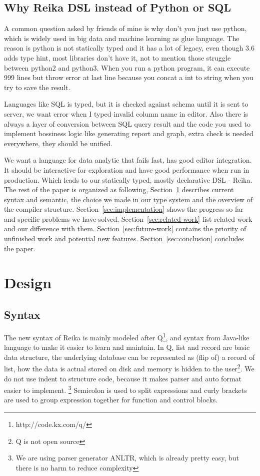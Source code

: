 \documentclass{article}
\begin{document}
\subsection{Why Reika DSL instead of Python or SQL}
\label{subsec:why-reika}

A common question asked by friends of mine is why don't you just use python,
which is widely used in big data and machine learning as glue language.
The reason is python is not statically typed and it has a lot of legacy,
even though 3.6 adds type hint, most libraries don't have it, not to mention those struggle between python2 and python3.
When you run a python program,
it can execute 999 lines but throw error at last line because you concat a int to string when you try to save the result.

Languages like SQL is typed, but it is checked against schema until it is sent to server,
we want error when I typed invalid column name in editor.
Also there is always a layer of conversion between SQL query result and the code you used to implement bossiness logic
like generating report and graph, extra check is needed everywhere, they should be unified.

We want a language for data analytic that fails fast, has good editor integration.
It should be interactive for exploration and have good performance when run in production.
Which leads to our statically typed, mostly declarative DSL - Reika.
The rest of the paper is organized as following,
Section~\ref{sec:design} describes current syntax and semantic,
the choice we made in our type system and the overview of the compiler structure.
Section~\ref{sec:implementation} shows the progress so far and specific problems we have solved.
Section~\ref{sec:related-work} list related work and our difference with them.
Section~\ref{sec:future-work} contains the priority of unfinished work and potential new features.
Section~\ref{sec:conclusion} concludes the paper.

\section{Design}
\label{sec:design}

\subsection{Syntax}
\label{subsec:syntax}

The new syntax of Reika is mainly modeled after Q\footnote{http://code.kx.com/q/},
and syntax from Java-like language to make it easier to learn and maintain.
In Q, list and record are basic data structure, the underlying database can be represented as (flip of) a record of list,
how the data is actual stored on disk and memory is hidden to the user\footnote{Q is not open source}.
We do not use indent to structure code, because it makes parser and auto format easier to implement.
\footnote{We are using parser generator ANLTR, which is already pretty easy, but there is no harm to reduce complexity}
Semicolon is used to split expressions and curly brackets are used to group expression together for function and control blocks.
\end{document}
